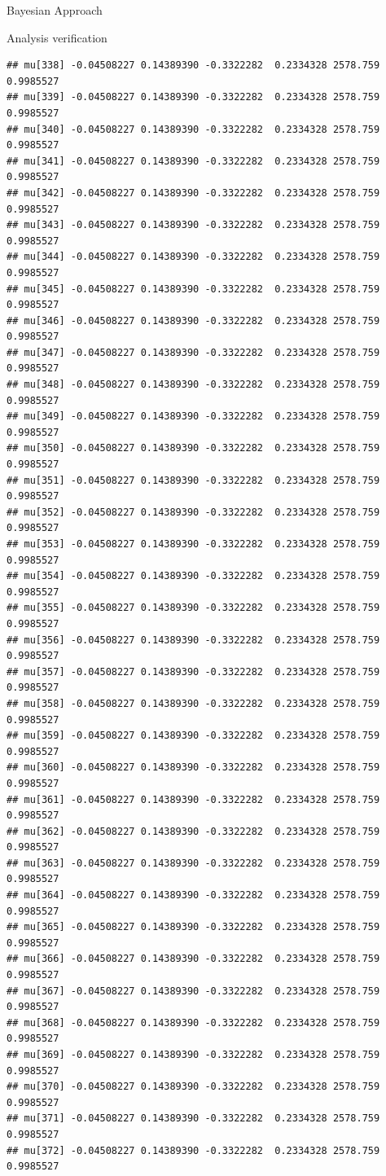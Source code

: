\documentclass[
  ignorenonframetext,
]{beamer}
\begin{document}
\begin{frame}[fragile]{Bayesian Approach}
\begin{block}{Analysis verification}
\begin{verbatim}
## mu[338] -0.04508227 0.14389390 -0.3322282  0.2334328 2578.759 0.9985527
## mu[339] -0.04508227 0.14389390 -0.3322282  0.2334328 2578.759 0.9985527
## mu[340] -0.04508227 0.14389390 -0.3322282  0.2334328 2578.759 0.9985527
## mu[341] -0.04508227 0.14389390 -0.3322282  0.2334328 2578.759 0.9985527
## mu[342] -0.04508227 0.14389390 -0.3322282  0.2334328 2578.759 0.9985527
## mu[343] -0.04508227 0.14389390 -0.3322282  0.2334328 2578.759 0.9985527
## mu[344] -0.04508227 0.14389390 -0.3322282  0.2334328 2578.759 0.9985527
## mu[345] -0.04508227 0.14389390 -0.3322282  0.2334328 2578.759 0.9985527
## mu[346] -0.04508227 0.14389390 -0.3322282  0.2334328 2578.759 0.9985527
## mu[347] -0.04508227 0.14389390 -0.3322282  0.2334328 2578.759 0.9985527
## mu[348] -0.04508227 0.14389390 -0.3322282  0.2334328 2578.759 0.9985527
## mu[349] -0.04508227 0.14389390 -0.3322282  0.2334328 2578.759 0.9985527
## mu[350] -0.04508227 0.14389390 -0.3322282  0.2334328 2578.759 0.9985527
## mu[351] -0.04508227 0.14389390 -0.3322282  0.2334328 2578.759 0.9985527
## mu[352] -0.04508227 0.14389390 -0.3322282  0.2334328 2578.759 0.9985527
## mu[353] -0.04508227 0.14389390 -0.3322282  0.2334328 2578.759 0.9985527
## mu[354] -0.04508227 0.14389390 -0.3322282  0.2334328 2578.759 0.9985527
## mu[355] -0.04508227 0.14389390 -0.3322282  0.2334328 2578.759 0.9985527
## mu[356] -0.04508227 0.14389390 -0.3322282  0.2334328 2578.759 0.9985527
## mu[357] -0.04508227 0.14389390 -0.3322282  0.2334328 2578.759 0.9985527
## mu[358] -0.04508227 0.14389390 -0.3322282  0.2334328 2578.759 0.9985527
## mu[359] -0.04508227 0.14389390 -0.3322282  0.2334328 2578.759 0.9985527
## mu[360] -0.04508227 0.14389390 -0.3322282  0.2334328 2578.759 0.9985527
## mu[361] -0.04508227 0.14389390 -0.3322282  0.2334328 2578.759 0.9985527
## mu[362] -0.04508227 0.14389390 -0.3322282  0.2334328 2578.759 0.9985527
## mu[363] -0.04508227 0.14389390 -0.3322282  0.2334328 2578.759 0.9985527
## mu[364] -0.04508227 0.14389390 -0.3322282  0.2334328 2578.759 0.9985527
## mu[365] -0.04508227 0.14389390 -0.3322282  0.2334328 2578.759 0.9985527
## mu[366] -0.04508227 0.14389390 -0.3322282  0.2334328 2578.759 0.9985527
## mu[367] -0.04508227 0.14389390 -0.3322282  0.2334328 2578.759 0.9985527
## mu[368] -0.04508227 0.14389390 -0.3322282  0.2334328 2578.759 0.9985527
## mu[369] -0.04508227 0.14389390 -0.3322282  0.2334328 2578.759 0.9985527
## mu[370] -0.04508227 0.14389390 -0.3322282  0.2334328 2578.759 0.9985527
## mu[371] -0.04508227 0.14389390 -0.3322282  0.2334328 2578.759 0.9985527
## mu[372] -0.04508227 0.14389390 -0.3322282  0.2334328 2578.759 0.9985527

\end{verbatim}
\end{block}
\end{frame}
\end{document}

